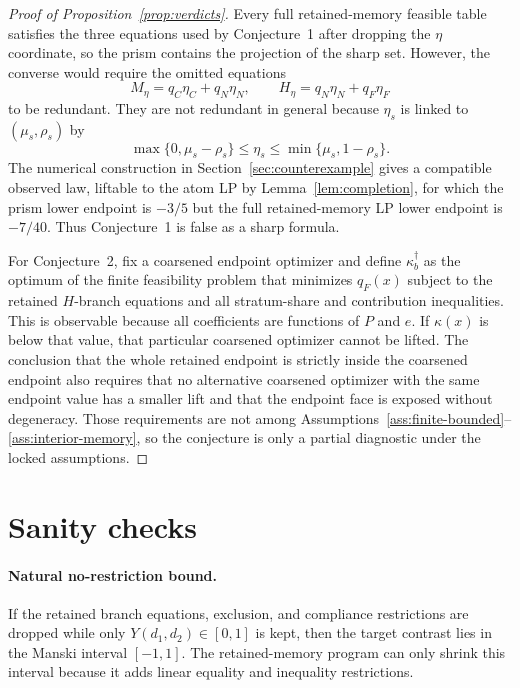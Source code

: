 \documentclass[11pt]{article}
\theoremstyle{definition}
\theoremstyle{plain}
\theoremstyle{remark}
\begin{document}
\begin{proof}[Proof of Proposition~\ref{prop:verdicts}]
Every full retained-memory feasible table satisfies the three equations used by Conjecture~1 after dropping the \(\eta\) coordinate, so the prism contains the projection of the sharp set.
However, the converse would require the omitted equations
\[
M_\eta=q_C\eta_C+q_N\eta_N,\qquad
H_\eta=q_N\eta_N+q_F\eta_F
\]
to be redundant.
They are not redundant in general because \(\eta_s\) is linked to \((\mu_s,\rho_s)\) by
\[
\max\{0,\mu_s-\rho_s\}\le\eta_s\le\min\{\mu_s,1-\rho_s\}.
\]
The numerical construction in Section~\ref{sec:counterexample} gives a compatible observed law, liftable to the atom LP by Lemma~\ref{lem:completion}, for which the prism lower endpoint is \(-3/5\) but the full retained-memory LP lower endpoint is \(-7/40\).
Thus Conjecture~1 is false as a sharp formula.

For Conjecture~2, fix a coarsened endpoint optimizer and define \(\kappa_b^\dagger\) as the optimum of the finite feasibility problem that minimizes \(q_F(x)\) subject to the retained \(H\)-branch equations and all stratum-share and contribution inequalities.
This is observable because all coefficients are functions of \(P\) and \(e\).
If \(\kappa(x)\) is below that value, that particular coarsened optimizer cannot be lifted.
The conclusion that the whole retained endpoint is strictly inside the coarsened endpoint also requires that no alternative coarsened optimizer with the same endpoint value has a smaller lift and that the endpoint face is exposed without degeneracy.
Those requirements are not among Assumptions~\ref{ass:finite-bounded}--\ref{ass:interior-memory}, so the conjecture is only a partial diagnostic under the locked assumptions.
\end{proof}

\section{Sanity checks}
\paragraph{Natural no-restriction bound.}
If the retained branch equations, exclusion, and compliance restrictions are dropped while only \(Y(d_1,d_2)\in[0,1]\) is kept, then the target contrast lies in the Manski interval \([-1,1]\).
The retained-memory program can only shrink this interval because it adds linear equality and inequality restrictions.
\end{document}
